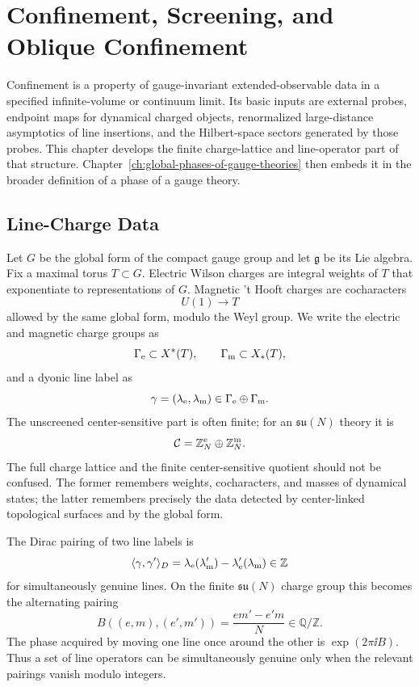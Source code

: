 \chapter{Confinement, Screening, and Oblique Confinement}
\label{ch:global-confinement-screening-oblique}

\ConventionsEuclidean

Confinement is a property of gauge-invariant extended-observable data in a
specified infinite-volume or continuum limit.  Its basic inputs are external
probes, endpoint maps for dynamical charged objects, renormalized
large-distance asymptotics of line insertions, and the Hilbert-space sectors
generated by those probes.  This chapter develops the finite charge-lattice
and line-operator part of that structure.
Chapter~\ref{ch:global-phases-of-gauge-theories} then embeds it in the
broader definition of a phase of a gauge theory.

\section{Line-Charge Data}

Let \(G\) be the global form of the compact gauge group and let
\(\mathfrak g\) be its Lie algebra.  Fix a maximal torus \(T\subset G\).
Electric Wilson charges are integral weights of \(T\) that exponentiate to
representations of \(G\).  Magnetic 't Hooft charges are cocharacters
\[
  U(1)\longrightarrow T
\]
allowed by the same global form, modulo the Weyl group.  We write the
electric and magnetic charge groups as
\[
  \Gamma_{\rm e}\subset X^*(T),
  \qquad
  \Gamma_{\rm m}\subset X_*(T),
\]
and a dyonic line label as
\[
  \gamma=(\lambda_{\rm e},\lambda_{\rm m})
  \in \Gamma_{\rm e}\oplus\Gamma_{\rm m}.
\]
The unscreened center-sensitive part is often finite; for an
\(\mathfrak{su}(N)\) theory it is
\[
  \mathcal C
  =
  \mathbb Z_N^{\rm e}\oplus\mathbb Z_N^{\rm m}.
\]
The full charge lattice and the finite center-sensitive quotient should not
be confused.  The former remembers weights, cocharacters, and masses of
dynamical states; the latter remembers precisely the data detected by
center-linked topological surfaces and by the global form.

The Dirac pairing of two line labels is
\begin{equation}
  \langle \gamma,\gamma'\rangle_D
  =
  \lambda_{\rm e}(\lambda'_{\rm m})
  -
  \lambda'_{\rm e}(\lambda_{\rm m})
  \in\mathbb Z
  \label{eq:dirac-pairing-full-lattice}
\end{equation}
for simultaneously genuine lines.  On the finite
\(\mathfrak{su}(N)\) charge group this becomes the alternating pairing
\begin{equation}
  B((e,m),(e',m'))
  =
  \frac{em'-e'm}{N}
  \in\mathbb Q/\mathbb Z .
  \label{eq:finite-dirac-pairing-confinement}
\end{equation}
The phase acquired by moving one line once around the other is
\(\exp(2\pi\ii B)\).  Thus a set of line operators can be simultaneously
genuine only when the relevant pairings vanish modulo integers.

